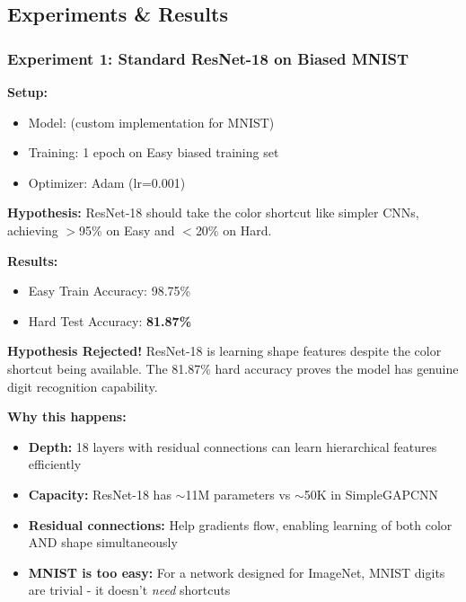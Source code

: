 \documentclass[9pt,a4paper,twocolumn,twoside]{tau-class/tau}
\begin{document}
    \subsection{Experiments \& Results}

        \subsubsection{Experiment 1: Standard ResNet-18 on Biased MNIST}

        \textbf{Setup:}
        \begin{itemize}
            \item Model:  (custom implementation for MNIST)
            \item Training: 1 epoch on Easy biased training set
            \item Optimizer: Adam (lr=0.001)
        \end{itemize}

        \textbf{Hypothesis:} ResNet-18 should take the color shortcut like simpler CNNs, achieving $>$95\% on Easy and $<$20\% on Hard.

        \textbf{Results:}
        \begin{itemize}
            \item Easy Train Accuracy: 98.75\%
            \item Hard Test Accuracy: \textbf{81.87\%}
        \end{itemize}

        \begin{note}
            \textbf{Hypothesis Rejected!} ResNet-18 is learning shape features despite the color shortcut being available. The 81.87\% hard accuracy proves the model has genuine digit recognition capability.

            \textbf{Why this happens:}
            \begin{itemize}
                \item \textbf{Depth:} 18 layers with residual connections can learn hierarchical features efficiently
                \item \textbf{Capacity:} ResNet-18 has $\sim$11M parameters vs $\sim$50K in SimpleGAPCNN
                \item \textbf{Residual connections:} Help gradients flow, enabling learning of both color AND shape simultaneously
                \item \textbf{MNIST is too easy:} For a network designed for ImageNet, MNIST digits are trivial - it doesn't \textit{need} shortcuts
            \end{itemize}
        \end{note}
\end{document}
